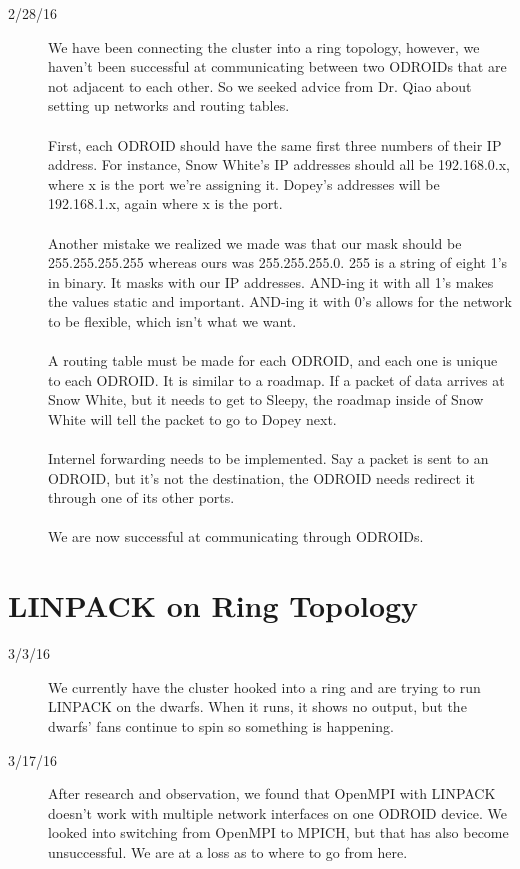 \begin{description}
\item [2/28/16] We have been connecting the cluster into a ring topology, however, we haven't been successful at communicating between two ODROIDs that are not adjacent to each other. So we seeked advice from Dr. Qiao about setting up networks and routing tables. \\ \\
First, each ODROID should have the same first three numbers of their IP address. For instance, Snow White's IP addresses should all be 192.168.0.x, where x is the port we're assigning it. Dopey's addresses will be 192.168.1.x, again where x is the port. \\ \\
Another mistake we realized we made was that our mask should be 255.255.255.255 whereas ours was 255.255.255.0. 255 is a string of eight 1's in binary. It masks with our IP addresses. AND-ing it with all 1's makes the values static and important. AND-ing it with 0's allows for the network to be flexible, which isn't what we want. \\ \\
A routing table must be made for each ODROID, and each one is unique to each ODROID. It is similar to a roadmap. If a packet of data arrives at Snow White, but it needs to get to Sleepy, the roadmap inside of Snow White will tell the packet to go to Dopey next. \\ \\
Internel forwarding needs to be implemented. Say a packet is sent to an ODROID, but it's not the destination, the ODROID needs redirect it through one of its other ports. \\ \\
We are now successful at communicating through ODROIDs.
\end{description}

\section{LINPACK on Ring Topology}
\begin{description}
\item [3/3/16] We currently have the cluster hooked into a ring and are trying to run LINPACK on the dwarfs. When it runs, it shows no output, but the dwarfs' fans continue to spin so something is happening.
\item [3/17/16] After research and observation, we found that OpenMPI with LINPACK doesn't work with multiple network interfaces on one ODROID device. We looked into switching from OpenMPI to MPICH, but that has also become unsuccessful. We are at a loss as to where to go from here.
\end{description}

